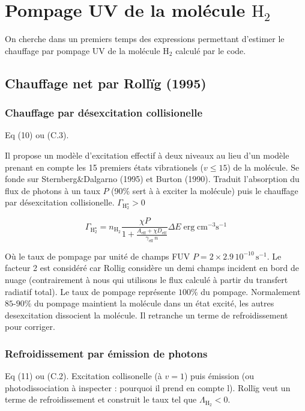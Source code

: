 \section{Pompage UV de la molécule $\mathrm{H}_2$}


On cherche dans un premiers temps des expressions permettant d'estimer le chauffage par pompage UV de la molécule $\mathrm{H}_2$ calculé par le code. 

\subsection{Chauffage net par Rollïg (1995)}

\subsubsection{Chauffage par désexcitation collisionelle}
Eq (10) ou (C.3).

Il propose un modèle d'excitation effectif à deux niveaux au lieu d'un modèle prenant en compte les 15 premiers états vibrationels ($v\leq 15$) de la molécule. Se fonde sur Sternberg&Dalgarno (1995) et Burton (1990). Traduit l'absorption du flux de photons à un taux $P$ (90\% sert à à exciter la molécule) puis le chauffage par désexcitation collisionelle. 
$\Gamma_{\mathrm{H}_2^\star} > 0$
 
\begin{equation}
\Gamma_{\mathrm{H}_2^\star} = n_{\mathrm{H}_2}\frac{\chi P}{1 + \frac{A_{\text{eff}}+ \chi D_{\text{eff}}}{\gamma_{\text{eff}}\, n}} \Delta E \operatorname{erg} \mathrm{cm}^{-3} \mathrm{s}^{-1}
\end{equation}

Où le taux de pompage par unité de champs FUV $P = 2 \times 2.9\,10^{-10}\,\mathrm{s}^{-1}$. Le facteur 2 est considéré car Rollig considère un demi champs incident en bord de nuage (contrairement à nous qui utilisons le flux calculé à partir du transfert radiatif total). Le taux de pompage représente $100\%$ du pompage. Normalement $85$-$90\%$ du pompage maintient la molécule dans un état excité, les autres desexcitation dissocient la molécule. Il retranche un terme de refroidissement pour corriger.

\subsubsection{Refroidissement par émission de photons}

Eq (11) ou (C.2).
Excitation collisonelle (à $v=1$) puis émission (ou photodissociation à inspecter : pourquoi il prend en compte l). Rollïg veut un terme de refroidissement et construit le taux tel que $\Lambda_{\mathrm{H}_2} < 0$.

